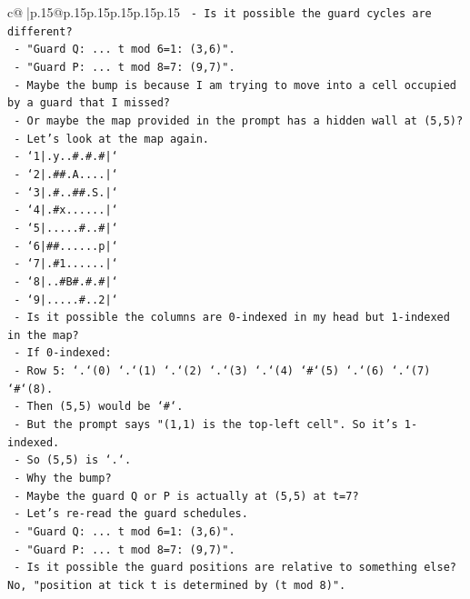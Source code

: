 \documentclass{article}
\begin{document}
{\begin{supertabular}{c@{$\;$}|p{.15\linewidth}@{}p{.15\linewidth}p{.15\linewidth}p{.15\linewidth}p{.15\linewidth}p{.15\linewidth}}
{{{\texttt{      {-} Is it possible the guard cycles are different?} \\
\texttt{      {-} "Guard Q: ... t mod 6=1: (3,6)".} \\
\texttt{      {-} "Guard P: ... t mod 8=7: (9,7)".} \\
\texttt{      {-} Maybe the bump is because I am trying to move into a cell occupied by a guard that I missed?} \\
\texttt{      {-} Or maybe the map provided in the prompt has a hidden wall at (5,5)?} \\
\texttt{      {-} Let's look at the map again.} \\
\texttt{      {-} `1|.y..\#.\#.\#|`} \\
\texttt{      {-} `2|.\#\#.A....|`} \\
\texttt{      {-} `3|.\#..\#\#.S.|`} \\
\texttt{      {-} `4|.\#x......|`} \\
\texttt{      {-} `5|.....\#..\#|`} \\
\texttt{      {-} `6|\#\#......p|`} \\
\texttt{      {-} `7|.\#1......|`} \\
\texttt{      {-} `8|..\#B\#.\#.\#|`} \\
\texttt{      {-} `9|.....\#..2|`} \\
\texttt{      {-} Is it possible the columns are 0{-}indexed in my head but 1{-}indexed in the map?} \\
\texttt{      {-} If 0{-}indexed:} \\
\texttt{        {-} Row 5: `.`(0) `.`(1) `.`(2) `.`(3) `.`(4) `\#`(5) `.`(6) `.`(7) `\#`(8).} \\
\texttt{        {-} Then (5,5) would be `\#`.} \\
\texttt{        {-} But the prompt says "(1,1) is the top{-}left cell". So it's 1{-}indexed.} \\
\texttt{        {-} So (5,5) is `.`.} \\
\texttt{      {-} Why the bump?} \\
\texttt{      {-} Maybe the guard Q or P is actually at (5,5) at t=7?} \\
\texttt{      {-} Let's re{-}read the guard schedules.} \\
\texttt{      {-} "Guard Q: ... t mod 6=1: (3,6)".} \\
\texttt{      {-} "Guard P: ... t mod 8=7: (9,7)".} \\
\texttt{      {-} Is it possible the guard positions are relative to something else? No, "position at tick t is determined by (t mod 8)".} \\
}}}
\end{supertabular}}
\end{document}
